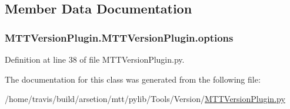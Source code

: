 \subsection{Member Data Documentation}
\hypertarget{classMTTVersionPlugin_1_1MTTVersionPlugin_a95c4231c332e3aa0af05703aa9858c8c}{
\subsubsection[{options}]{\setlength{\rightskip}{0pt plus 5cm}M\-T\-T\-Version\-Plugin.\-M\-T\-T\-Version\-Plugin.\-options}}\label{classMTTVersionPlugin_1_1MTTVersionPlugin_a95c4231c332e3aa0af05703aa9858c8c}


Definition at line 38 of file M\-T\-T\-Version\-Plugin.\-py.



The documentation for this class was generated from the following file\-:\begin{DoxyCompactItemize}
\item 
/home/travis/build/arsetion/mtt/pylib/\-Tools/\-Version/\hyperlink{MTTVersionPlugin_8py}{M\-T\-T\-Version\-Plugin.\-py}\end{DoxyCompactItemize}
